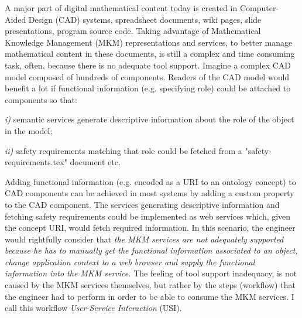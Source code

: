 \documentclass{llncs}
\begin{document}
A major part of digital mathematical content today is created in Computer-Aided Design (CAD) systems, spreadsheet documents, wiki pages, slide presentations, program source code. Taking advantage of Mathematical Knowledge Management (MKM) representations and services, to better manage mathematical content in these documents, is still a complex and time consuming task, often, because there is no adequate tool support. Imagine a complex CAD model composed of hundreds of components. Readers of the CAD model would benefit a lot if functional information (e.g. specifying role) could be attached to components so that: 
\begin{inparaenum}
\item [\textit{i)}] semantic services generate descriptive information about the role of the object in the model;
\item [\textit{ii)}] safety requirements matching that role could be fetched from a "safety-requirements.tex" document etc.
\end{inparaenum}
Adding functional information (e.g. encoded as a URI to an ontology concept) to CAD components can be achieved in most systems by adding a custom property to the CAD component. The services generating descriptive information and fetching safety requirements could be implemented as web services which, given the concept URI, would fetch required information. In this scenario, the engineer would rightfully consider that \textit{the MKM services are not adequately supported because he has to manually get the functional information associated to an object, change application context to a web browser and supply the functional information into the MKM service.} 
The feeling of tool support inadequacy, is not caused by the MKM services themselves, but rather by the steps (workflow) that the engineer had to perform in order to be able to consume the MKM services. I call this workflow \textit{User-Service Interaction} (USI). 
\end{document}

